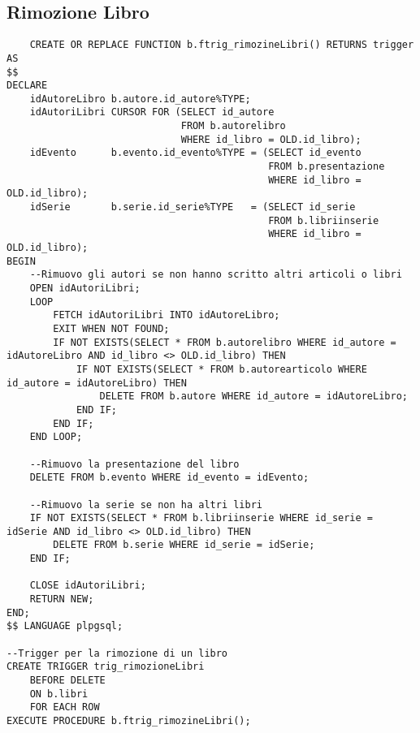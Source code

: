\subsection{Rimozione Libro}
\begin{lstlisting}
    CREATE OR REPLACE FUNCTION b.ftrig_rimozineLibri() RETURNS trigger AS
$$
DECLARE
    idAutoreLibro b.autore.id_autore%TYPE;
    idAutoriLibri CURSOR FOR (SELECT id_autore
                              FROM b.autorelibro
                              WHERE id_libro = OLD.id_libro);
    idEvento      b.evento.id_evento%TYPE = (SELECT id_evento
                                             FROM b.presentazione
                                             WHERE id_libro = OLD.id_libro);
    idSerie       b.serie.id_serie%TYPE   = (SELECT id_serie
                                             FROM b.libriinserie
                                             WHERE id_libro = OLD.id_libro);
BEGIN
    --Rimuovo gli autori se non hanno scritto altri articoli o libri
    OPEN idAutoriLibri;
    LOOP
        FETCH idAutoriLibri INTO idAutoreLibro;
        EXIT WHEN NOT FOUND;
        IF NOT EXISTS(SELECT * FROM b.autorelibro WHERE id_autore = idAutoreLibro AND id_libro <> OLD.id_libro) THEN
            IF NOT EXISTS(SELECT * FROM b.autorearticolo WHERE id_autore = idAutoreLibro) THEN
                DELETE FROM b.autore WHERE id_autore = idAutoreLibro;
            END IF;
        END IF;
    END LOOP;

    --Rimuovo la presentazione del libro
    DELETE FROM b.evento WHERE id_evento = idEvento;

    --Rimuovo la serie se non ha altri libri
    IF NOT EXISTS(SELECT * FROM b.libriinserie WHERE id_serie = idSerie AND id_libro <> OLD.id_libro) THEN
        DELETE FROM b.serie WHERE id_serie = idSerie;
    END IF;

    CLOSE idAutoriLibri;
    RETURN NEW;
END;
$$ LANGUAGE plpgsql;

--Trigger per la rimozione di un libro
CREATE TRIGGER trig_rimozioneLibri
    BEFORE DELETE
    ON b.libri
    FOR EACH ROW
EXECUTE PROCEDURE b.ftrig_rimozineLibri();
\end{lstlisting}

